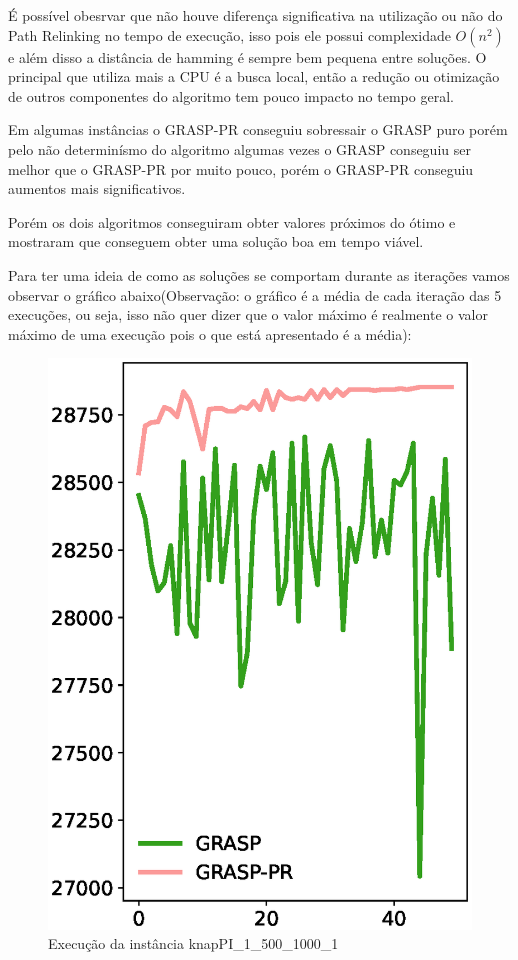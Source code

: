\documentclass[11pt]{article}
\begin{document}
É possível obesrvar que não houve diferença significativa na utilização ou não do Path Relinking no tempo de execução, isso pois ele possui complexidade \(O(n^2)\) e além disso a distância de hamming é sempre bem pequena entre soluções. O principal que utiliza mais a CPU é a busca local, então a redução ou otimização de outros componentes do algoritmo tem pouco impacto no tempo geral.

Em algumas instâncias o GRASP-PR conseguiu sobressair o GRASP puro porém pelo não determinísmo do algoritmo algumas vezes o GRASP conseguiu ser melhor que o GRASP-PR por muito pouco, porém o GRASP-PR conseguiu aumentos mais significativos.

Porém os dois algoritmos conseguiram obter valores próximos do ótimo e mostraram que conseguem obter uma solução boa em tempo viável.

Para ter uma ideia de como as soluções se comportam durante as iterações vamos observar o gráfico abaixo(Observação: o gráfico é a média de cada iteração das 5 execuções, ou seja, isso não quer dizer que o valor máximo é realmente o valor máximo de uma execução pois o que está apresentado é a média):

\begin{figure}[H]
	\centering
	\includegraphics[scale=0.5]{knapPI_1_500_1000_1_iterations.eps}
	\caption{Execução da instância knapPI\_1\_500\_1000\_1}
\end{figure}
\end{document}

